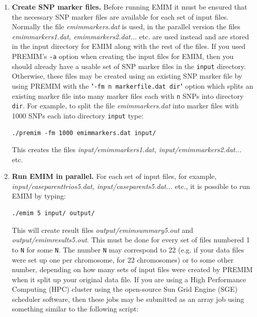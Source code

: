 \documentclass[a4paper,12pt]{article}
\newcommand{\code}[1]{{\footnotesize{{\tt #1}}}}
\begin{document}
\begin{enumerate}
\item {\bf Create SNP marker files.} Before running EMIM it must be ensured that the necessary SNP marker files are available for each set of input files. Normally the file {\it emimmarkers.dat} is used, in the parallel version the files {\it emimmarkers1.dat, emimmarkers2.dat...} etc. are used instead and are stored in the input directory for EMIM along with the rest of the files. If you used PREMIM's \code{-a} option when creating the input files for EMIM, then you should already have a usable set of SNP marker files in the \code{input} directory. Otherwise, these files may be created using an existing SNP marker file by using PREMIM with the "\code{-fm n markerfile.dat dir}" option which splits an existing marker file into many marker files each with \code{n} SNPs into directory \code{dir}. For example, to split the file {\it emimmarkers.dat} into marker files with 1000 SNPs each into directory \code{input} type: \vspace{0.35cm} \begin{lstlisting}
./premim -fm 1000 emimmarkers.dat input/ 
\end{lstlisting} \vspace{0.35cm}This creates the files {\it input/emimmarkers1.dat, input/emimmarkers2.dat...} etc. 
\item {\bf Run EMIM in parallel.} For each set of input files, for example, {\it input/caseparenttrios5.dat, input/caseparents5.dat...} etc., it is possible to run EMIM by typing: \vspace{0.35cm} \begin{lstlisting}
./emim 5 input/ output/ 
\end{lstlisting} \vspace{0.35cm}This will create result files {\it output/emimsummary5.out} and {\it output/emimresults5.out}. This must be done for every set of files numbered 1 to \code{N} for some \code{N}. The number \code{N} may correspond to 22 (e.g. if your data files were set up one per chromosome, for 22 chromosomes) or to some other number, depending on how many sets of input files were created by PREMIM when it split up your original data file. If you are using a High Performance Computing (HPC) cluster using the open-source Sun Grid Engine (SGE) scheduler software, then these jobs may be submitted as an array job using something similar to the following script: \vspace{0.35cm} \begin{lstlisting}


\end{lstlisting}
\end{enumerate}
\end{document}

